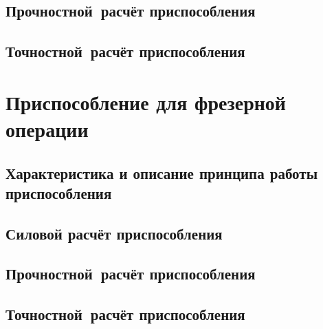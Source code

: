 \documentclass[14pt,russian,a4paper]{extreport}
\begin{document}
\subsection{Прочностной расчёт приспособления}
\subsection{Точностной расчёт приспособления}

\section{Приспособление для фрезерной операции}

\subsection{Характеристика и описание принципа работы приспособления}
\subsection{Силовой расчёт приспособления}
\subsection{Прочностной расчёт приспособления}
\subsection{Точностной расчёт приспособления}



\nocite{malvyat:okp}

\nocite{burtsev:tm2}
\nocite{bezyazichny:otm}
\nocite{blumenstejn:pto}
\nocite{kosilova:stm2}
\nocite{tarabarin:pto}
\nocite{gost:2-121-73}
\nocite{gost:14-205-83}
\nocite{gost:3-1404-86}
\nocite{gost:3-1118-88}
\nocite{gost:2-105-95}
\nocite{gost:3-1702-79}

\printbibliography[heading=none]
\end{document}
